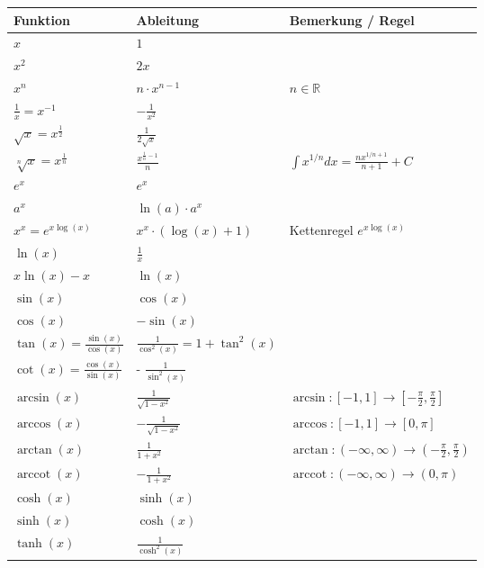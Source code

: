 \documentclass[25pt]{sciposter}
\newcommand{\R}{\mathbb{R}}
\begin{document}
\begin{multicols}{3}
\vfill\null
\columnbreak


{\renewcommand{\arraystretch}{1.5}
	\begin{table}[]
		\begin{tabular}{@{} p{} p{} p{} @{}}
			\toprule
			Funktion & Ableitung & Bemerkung / Regel\\ \midrule
			$x$ & $1$ &   \\
			$x^2$& $2x$ &   \\
			$x^n$& $n\cdot x^{n-1}$ & $n \in \R$  \\
			$\frac{1}{x} = x^{-1}$ & $- \frac{1}{x^2}$ & \\
			$\sqrt{x} = x^{\frac{1}{2}}$ & $\frac{1}{2\sqrt{x}}$ & \\ 
			$\sqrt[n]{x} = x^{\frac{1}{n}}$ & $\frac{x^{\frac{1}{n} -1 }}{n}$ &  $\int x^{1/n} dx = \frac{n x^{1/n + 1}}{n+1} + C$\\ 
			$e^x$ & $e^x$ & \\
			$a^x$ & $\ln(a) \cdot a^x$& \\
			$x^x = e^{x\log(x)}$ & $x^x \cdot (\log(x) + 1)$ & Kettenregel $e^{x\log(x)}$\\
			$\ln(x)$ & $\frac{1}{x}$ & \\
			$x\ln(x) - x$ & $\ln(x)$ &  \\ \midrule
			$\sin(x)$ & $\cos(x)$ & \\
			$\cos(x)$ & $- \sin(x)$ & \\ 
			$\tan(x) = \frac{\sin(x)}{\cos(x)}$ & $\frac{1}{\cos^2(x)} = 1 + \tan^2(x)$ &\\
			$\cot(x) = \frac{\cos(x)}{\sin(x)}$ & - $\frac{1}{\sin^2(x)}$ & \\ 
			$\arcsin(x)$ & $\frac{1}{\sqrt{1 - x^2}}$ & $ \arcsin : [-1,1] \to [-\frac{\pi}{2},\frac{\pi}{2}]$\\
			$\arccos(x)$ & $ - \frac{1}{\sqrt{1-x^2}}$ & $\arccos : [-1,1] \to [0, \pi]$\\
			$\arctan(x)$ & $\frac{1}{1+x^2}$ & $\arctan:(-\infty, \infty) \to (- \frac{\pi}{2},\frac{\pi}{2})$\\
			$\operatorname{arccot}(x)$ & $ - \frac{1}{1+x^2} $ & $\operatorname{arccot} : (-\infty, \infty) \to (0,\pi)$\\
			\midrule
			$\cosh(x)$ & $\sinh(x)$ &\\
			$\sinh(x)$ & $\cosh(x)$ & \\
			$\tanh(x)$ & $\frac{1}{\cosh^2(x)}$ & \\

\end{tabular}
\end{table}}
\end{multicols}
\end{document}
